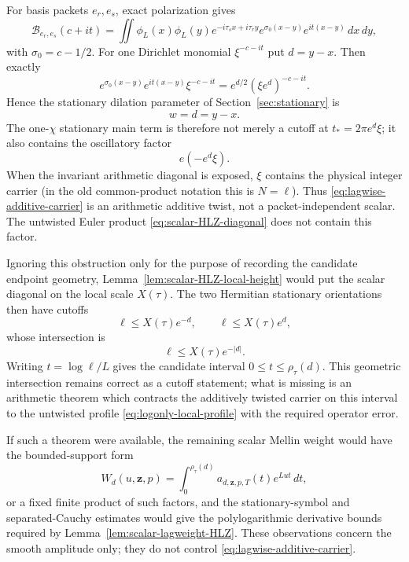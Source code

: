 For basis packets $e_r,e_s$, exact polarization gives
\begin{equation}
\mathcal B_{e_r,e_s}(c+it)
=\iint\phi_L(x)\phi_L(y)e^{-i\tau_sx+i\tau_ry}
 e^{\sigma_0(x-y)}e^{it(x-y)}\,dx\,dy,
\label{eq:lagwise-polarization-recall}
\end{equation}
with $\sigma_0=c-1/2$. For one Dirichlet monomial $\xi^{-c-it}$ put
$d=y-x$. Then exactly
\[
e^{\sigma_0(x-y)}e^{it(x-y)}\xi^{-c-it}
=e^{d/2}(\xi e^d)^{-c-it}.
\]
Hence the stationary dilation parameter of Section~\ref{sec:stationary} is
\begin{equation}
\boxed{w=d=y-x.}
\label{eq:true-packet-lag}
\end{equation}
The one-$\chi$ stationary main term is therefore not merely a cutoff at
$t_*=2\pi e^d\xi$; it also contains the oscillatory factor
\begin{equation}
\boxed{e(-e^d\xi).}
\label{eq:lagwise-additive-carrier}
\end{equation}
When the invariant arithmetic diagonal is exposed, $\xi$ contains the physical
integer carrier (in the old common-product notation this is $N=\ell$).  Thus
\eqref{eq:lagwise-additive-carrier} is an arithmetic additive twist, not a
packet-independent scalar.  The untwisted Euler product
\eqref{eq:scalar-HLZ-diagonal} does not contain this factor.

Ignoring this obstruction only for the purpose of recording the candidate
endpoint geometry, Lemma~\ref{lem:scalar-HLZ-local-height} would put the scalar
diagonal on the local scale $X(\tau)$.  The two Hermitian stationary
orientations then have cutoffs
\[
\ell\le X(\tau)e^{-d},\qquad
\ell\le X(\tau)e^{d},
\]
whose intersection is
\begin{equation}
\boxed{\ell\le X(\tau)e^{-|d|}.}
\label{eq:lagwise-common-cutoff}
\end{equation}
Writing $t=\log\ell/L$ gives the candidate interval
$0\le t\le\rho_\tau(d)$.  This geometric intersection remains correct as a
cutoff statement; what is missing is an arithmetic theorem which contracts the
additively twisted carrier on this interval to the untwisted profile
\eqref{eq:logonly-local-profile} with the required operator error.

If such a theorem were available, the remaining scalar Mellin weight would
have the bounded-support form
\begin{equation}
W_d(u,\mathbf z,p)
=\int_0^{\rho_\tau(d)}
 a_{d,\mathbf z,p,T}(t)e^{Lut}\,dt,
\label{eq:lagwise-Mellin-weight}
\end{equation}
or a fixed finite product of such factors, and the stationary-symbol and
separated-Cauchy estimates would give the polylogarithmic derivative bounds
required by Lemma~\ref{lem:scalar-lagweight-HLZ}.  These observations concern
the smooth amplitude only; they do not control
\eqref{eq:lagwise-additive-carrier}.

